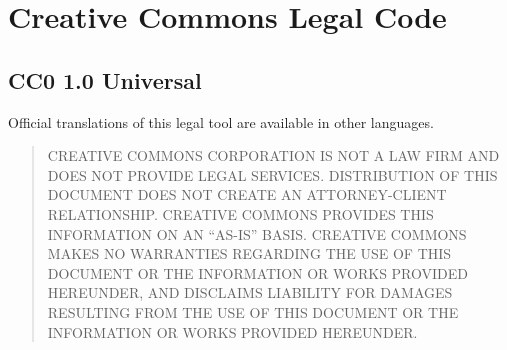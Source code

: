 \begin{comment}
\end{comment}

\section{Creative Commons Legal Code}

\subsection{CC0 1.0 Universal}







Official translations of this legal tool are available in other languages.


\begin{quotation}
CREATIVE COMMONS CORPORATION IS NOT A LAW FIRM AND DOES NOT
PROVIDE LEGAL SERVICES. DISTRIBUTION OF THIS DOCUMENT DOES
NOT CREATE AN ATTORNEY-CLIENT RELATIONSHIP. CREATIVE COMMONS
PROVIDES THIS INFORMATION ON AN ``AS-IS'' BASIS. CREATIVE
COMMONS MAKES NO WARRANTIES REGARDING THE USE OF THIS
DOCUMENT OR THE INFORMATION OR WORKS PROVIDED HEREUNDER, AND
DISCLAIMS LIABILITY FOR DAMAGES RESULTING FROM THE USE OF
THIS DOCUMENT OR THE INFORMATION OR WORKS PROVIDED
HEREUNDER.
\end{quotation}
